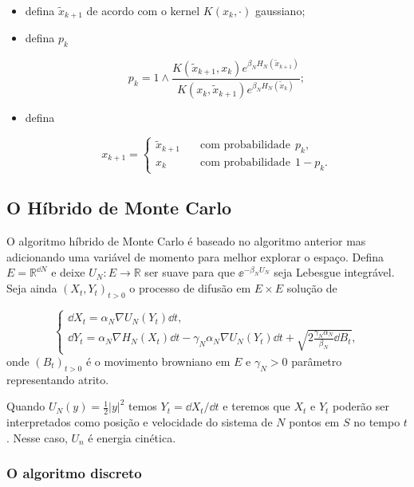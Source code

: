 \begin{itemize}
	\item defina $\tilde{x}_{k+1}$ de acordo com o kernel $K(x_k, \cdot)$ gaussiano;
	
	\item defina $p_k$
	
	\[
	p_k = 1 \wedge \frac{K(\tilde{x}_{k+1},x_k) e^{\beta_N H_N(\tilde{x}_{k+1})}}{K(x_{k},\tilde{x}_{k+1}) e^{\beta_N H_N(\tilde{x}_{k})}};
	\]
	
	\item defina
	
	\[
	x_{k+1} = 
	\begin{cases}
		\tilde{x}_{k+1} & \quad \text{com probabilidade} \ \ p_k,\\
		x_k &  \quad \text{com probabilidade} \ \ 1-p_k.
	\end{cases}
	\]
	
\end{itemize}

\subsection{O Híbrido de Monte Carlo}

O algoritmo híbrido de Monte Carlo é baseado no algoritmo anterior mas adicionando uma variável de momento para melhor explorar o espaço. Defina $E = \mathbb{R}^{\dd N}$ e deixe $U_N : E \rightarrow \mathbb{R}$ ser suave para que $\ee^{-\beta_N U_N}$ seja Lebesgue integrável. Seja ainda $(X_t, Y_t)_{t>0}$ o processo de difusão em $E \times E$ solução de

\[
\begin{cases}
	\dd X_t = \alpha_N \nabla U_N (Y_t) \dd t, \\
	\dd Y_t = \alpha_N \nabla H_N(X_t) \dd t - \gamma_N \alpha_N \nabla U_N(Y_t) \dd t + \sqrt{2\frac{\gamma_N \alpha_N}{\beta_N} \dd B_t},
\end{cases}
\]
onde $(B_t)_{t>0}$ é o movimento browniano em $E$ e $\gamma_N > 0$ parâmetro representando atrito.

Quando $U_N(y) = \frac{1}{2}|y|^2$ temos $Y_t = \dd X_t/\dd t$ e teremos que $X_t$ e $Y_t$ poderão ser interpretados como posição e velocidade do sistema de $N$ pontos em $S$ no tempo $t$. Nesse caso, $U_n$ é energia cinética.

\subsubsection{O algoritmo discreto}

